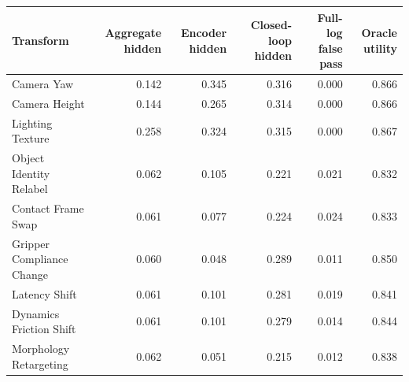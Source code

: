 \begin{tabular}{lrrrrr}
\toprule
Transform & Aggregate hidden & Encoder hidden & Closed-loop hidden & Full-log false pass & Oracle utility \\
\midrule
Camera Yaw & 0.142 & 0.345 & 0.316 & 0.000 & 0.866 \\
Camera Height & 0.144 & 0.265 & 0.314 & 0.000 & 0.866 \\
Lighting Texture & 0.258 & 0.324 & 0.315 & 0.000 & 0.867 \\
Object Identity Relabel & 0.062 & 0.105 & 0.221 & 0.021 & 0.832 \\
Contact Frame Swap & 0.061 & 0.077 & 0.224 & 0.024 & 0.833 \\
Gripper Compliance Change & 0.060 & 0.048 & 0.289 & 0.011 & 0.850 \\
Latency Shift & 0.061 & 0.101 & 0.281 & 0.019 & 0.841 \\
Dynamics Friction Shift & 0.061 & 0.101 & 0.279 & 0.014 & 0.844 \\
Morphology Retargeting & 0.062 & 0.051 & 0.215 & 0.012 & 0.838 \\
\bottomrule
\end{tabular}
